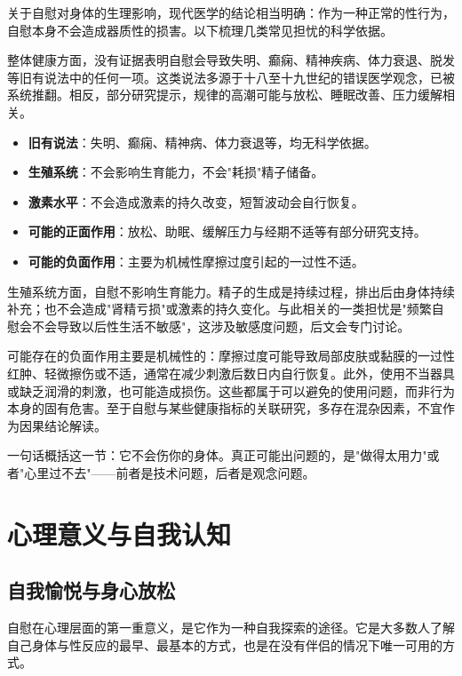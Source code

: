 \documentclass[12pt,UTF8]{ctexbook}
\newcommand{\keyword}[1]{\textbf{#1}}
\begin{document}
关于自慰对身体的生理影响，现代医学的结论相当明确：作为一种正常的性行为，自慰本身不会造成器质性的损害。以下梳理几类常见担忧的科学依据。

整体健康方面，没有证据表明自慰会导致失明、癫痫、精神疾病、体力衰退、脱发等旧有说法中的任何一项。这类说法多源于十八至十九世纪的错误医学观念，已被系统推翻。相反，部分研究提示，规律的高潮可能与放松、睡眠改善、压力缓解相关。

\begin{itemize}
	\item \keyword{旧有说法}：失明、癫痫、精神病、体力衰退等，均无科学依据。
	\item \keyword{生殖系统}：不会影响生育能力，不会"耗损"精子储备。
	\item \keyword{激素水平}：不会造成激素的持久改变，短暂波动会自行恢复。
	\item \keyword{可能的正面作用}：放松、助眠、缓解压力与经期不适等有部分研究支持。
	\item \keyword{可能的负面作用}：主要为机械性摩擦过度引起的一过性不适。
\end{itemize}

生殖系统方面，自慰不影响生育能力。精子的生成是持续过程，排出后由身体持续补充；也不会造成"肾精亏损"或激素的持久变化。与此相关的一类担忧是"频繁自慰会不会导致以后性生活不敏感"，这涉及敏感度问题，后文会专门讨论。

可能存在的负面作用主要是机械性的：摩擦过度可能导致局部皮肤或黏膜的一过性红肿、轻微擦伤或不适，通常在减少刺激后数日内自行恢复。此外，使用不当器具或缺乏润滑的刺激，也可能造成损伤。这些都属于可以避免的使用问题，而非行为本身的固有危害。至于自慰与某些健康指标的关联研究，多存在混杂因素，不宜作为因果结论解读。

\begin{tcolorbox}[colback=pink!5!white,colframe=red!50!black,title=贴心小叮咛]
	一句话概括这一节：它不会伤你的身体。真正可能出问题的，是"做得太用力"或者"心里过不去"——前者是技术问题，后者是观念问题。
\end{tcolorbox}

\section{心理意义与自我认知}
\subsection{自我愉悦与身心放松}

自慰在心理层面的第一重意义，是它作为一种自我探索的途径。它是大多数人了解自己身体与性反应的最早、最基本的方式，也是在没有伴侣的情况下唯一可用的方式。
\end{document}
